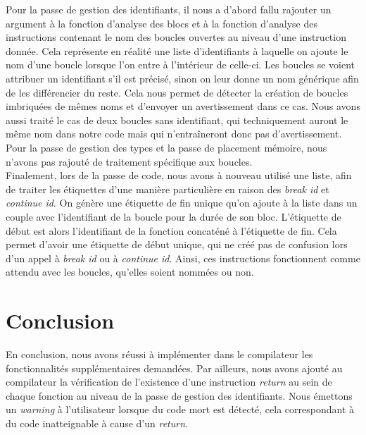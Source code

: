 \documentclass{article}
\begin{document}
Pour la passe de gestion des identifiants, il nous a d'abord fallu rajouter un argument à la fonction d'analyse des blocs et à la fonction d'analyse des instructions contenant le nom des boucles ouvertes au niveau d'une instruction donnée. Cela représente en réalité une liste d'identifiants à laquelle on ajoute le nom d'une boucle lorsque l'on entre à l'intérieur de celle-ci. Les boucles se voient attribuer un identifiant s'il est précisé, sinon on leur donne un nom générique afin de les différencier du reste. Cela nous permet de détecter la création de boucles imbriquées de mêmes noms et d'envoyer un avertissement dans ce cas. Nous avons aussi traité le cas de deux boucles sans identifiant, qui techniquement auront le même nom dans notre code mais qui n'entraîneront donc pas d'avertissement.\\

Pour la passe de gestion des types et la passe de placement mémoire, nous n'avons pas rajouté de traitement spécifique aux boucles.\\

Finalement, lors de la passe de code, nous avons à nouveau utilisé une liste, afin de traiter les étiquettes d'une manière particulière en raison des \textit{break id} et \textit{continue id}. On génère une étiquette de fin unique qu'on ajoute à la liste dans un couple avec l'identifiant de la boucle pour la durée de son bloc. L'étiquette de début est alors l'identifiant de la fonction concaténé à l'étiquette de fin. Cela permet d'avoir une étiquette de début unique, qui ne créé pas de confusion lors d'un appel à \textit{break id} ou à \textit{continue id}. Ainsi, ces instructions fonctionnent comme attendu avec les boucles, qu'elles soient nommées ou non.





\newpage
\section{Conclusion}
En conclusion, nous avons réussi à implémenter dans le compilateur les fonctionnalités supplémentaires demandées.
Par ailleurs, nous avons ajouté au compilateur la vérification de l'existence d'une instruction \textit{return} au sein de chaque fonction au niveau de la passe de gestion des identifiants. Nous émettons un \textit{warning} à l'utilisateur lorsque du code mort est détecté, cela correspondant à du code inatteignable à cause d'un \textit{return}.\\
\end{document}
